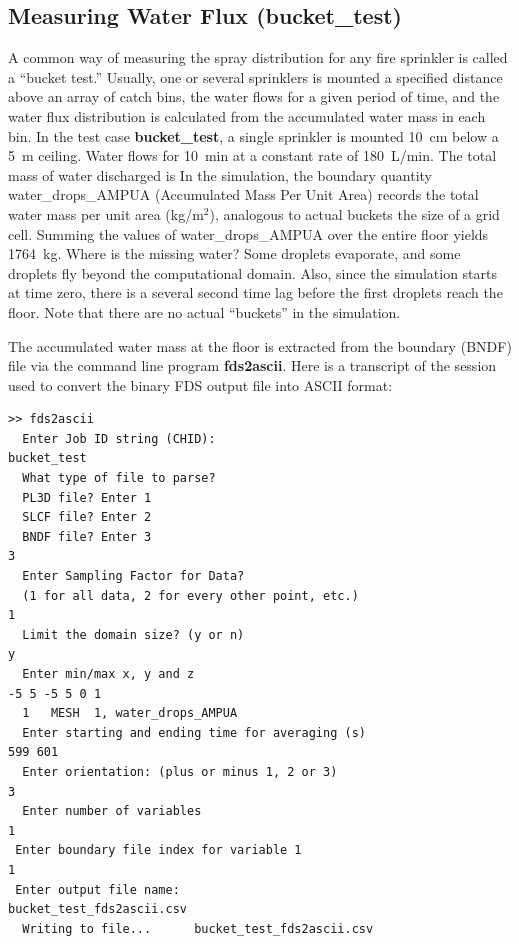\documentclass[11pt]{book}
\begin{document}
\clearpage

\subsection{Measuring Water Flux ({\bf bucket\_test}) }

A common way of measuring the spray distribution for any fire sprinkler is called a ``bucket test.''  Usually, one or several sprinklers is
mounted a specified distance above an array of catch bins, the water flows for a given period of time, and the water flux distribution is calculated
from the accumulated water mass in each bin. In the test case {\bf bucket\_test}, a single sprinkler is mounted 10~cm below a 5~m ceiling. Water
flows for 10~min at a constant rate of 180~L/min. The total mass of water discharged is
\be
\ee
In the simulation, the boundary quantity {\ct water\_drops\_AMPUA} (Accumulated Mass Per Unit Area) records the total water mass per unit area (kg/m$^2$), analogous to
actual buckets the size of a grid cell.
Summing the values of {\ct water\_drops\_AMPUA} over the entire floor yields 1764~kg. Where is the missing water? Some droplets evaporate, and some droplets
fly beyond the computational domain. Also, since the simulation starts at time zero, there is a several second time lag before the first droplets reach the floor. Note that
there are no actual ``buckets'' in the simulation.

The accumulated water mass at the floor is extracted from the boundary ({\ct BNDF}) file via the command line program {\bf fds2ascii}. Here is a transcript of the session
used to convert the binary FDS output file into ASCII format:

\footnotesize
\begin{verbatim}
>> fds2ascii
  Enter Job ID string (CHID):
bucket_test
  What type of file to parse?
  PL3D file? Enter 1
  SLCF file? Enter 2
  BNDF file? Enter 3
3
  Enter Sampling Factor for Data?
  (1 for all data, 2 for every other point, etc.)
1
  Limit the domain size? (y or n)
y
  Enter min/max x, y and z
-5 5 -5 5 0 1
  1   MESH  1, water_drops_AMPUA
  Enter starting and ending time for averaging (s)
599 601
  Enter orientation: (plus or minus 1, 2 or 3)
3
  Enter number of variables
1
 Enter boundary file index for variable 1
1
 Enter output file name:
bucket_test_fds2ascii.csv
  Writing to file...      bucket_test_fds2ascii.csv
\end{verbatim}
\end{document}
